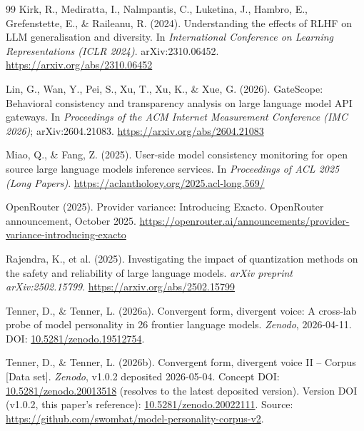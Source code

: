 \documentclass[11pt,a4paper]{article}
\begin{document}
\begin{thebibliography}{99}
Kirk, R., Mediratta, I., Nalmpantis, C., Luketina, J., Hambro, E., Grefenstette, E., \& Raileanu, R. (2024).
\newblock Understanding the effects of RLHF on LLM generalisation and diversity.
\newblock In \emph{International Conference on Learning Representations (ICLR 2024)}.
\newblock arXiv:2310.06452.
\newblock \url{https://arxiv.org/abs/2310.06452}

Lin, G., Wan, Y., Pei, S., Xu, T., Xu, K., \& Xue, G. (2026).
\newblock GateScope: Behavioral consistency and transparency analysis on large language model API gateways.
\newblock In \emph{Proceedings of the ACM Internet Measurement Conference (IMC 2026)}; arXiv:2604.21083.
\newblock \url{https://arxiv.org/abs/2604.21083}

Miao, Q., \& Fang, Z. (2025).
\newblock User-side model consistency monitoring for open source large language models inference services.
\newblock In \emph{Proceedings of ACL 2025 (Long Papers)}.
\newblock \url{https://aclanthology.org/2025.acl-long.569/}

OpenRouter (2025).
\newblock Provider variance: Introducing Exacto.
\newblock OpenRouter announcement, October 2025.
\newblock \url{https://openrouter.ai/announcements/provider-variance-introducing-exacto}

Rajendra, K., et al. (2025).
\newblock Investigating the impact of quantization methods on the safety and reliability of large language models.
\newblock \emph{arXiv preprint arXiv:2502.15799}.
\newblock \url{https://arxiv.org/abs/2502.15799}

Tenner, D., \& Tenner, L. (2026a).
\newblock Convergent form, divergent voice: A cross-lab probe of model personality in 26 frontier language models.
\newblock \emph{Zenodo}, 2026-04-11.
\newblock DOI: \href{https://doi.org/10.5281/zenodo.19512754}{10.5281/zenodo.19512754}.

Tenner, D., \& Tenner, L. (2026b).
\newblock Convergent form, divergent voice II -- Corpus [Data set].
\newblock \emph{Zenodo}, v1.0.2 deposited 2026-05-04.
\newblock Concept DOI: \href{https://doi.org/10.5281/zenodo.20013518}{10.5281/zenodo.20013518} (resolves to the latest deposited version).
\newblock Version DOI (v1.0.2, this paper's reference): \href{https://doi.org/10.5281/zenodo.20022111}{10.5281/zenodo.20022111}.
\newblock Source: \url{https://github.com/swombat/model-personality-corpus-v2}.


\end{thebibliography}
\end{document}
